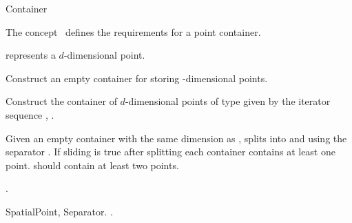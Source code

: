 

\begin{ccRefConcept}{Container}


\ccDefinition
  
The concept \ccRefName\ defines the requirements for
a point container. 

\ccParameters

 represents a $d$-dimensional point.


\ccCreation
{}  %

{
Construct an empty container for storing -dimensional points.
}

{
Construct the container of $d$-dimensional points of type 
given by the iterator sequence , .
}

\ccOperations

{Given an empty container  with the same dimension as , splits  into
 and  using the separator . If sliding is true after splitting 
each container contains at least one point.  should contain at least two points.}

\ccHasModels

.

\ccSeeAlso

SpatialPoint, Separator.
.

\end{ccRefConcept}


